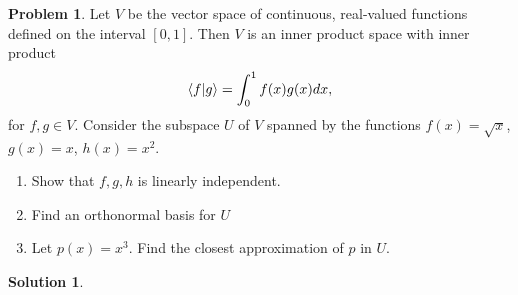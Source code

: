 \documentclass[10pt]{article}
\theoremstyle{definition}
\newtheorem{problem}{Problem}
\newtheorem{soln}{Solution}
\begin{document}
\begin{problem}
  Let $V$ be the vector space of continuous, real-valued functions defined
  on the interval $[0, 1]$. Then $V$ is an inner product space with inner
  product
  $$\braket{f}{g}=\int_{0}^{1}f(x)g(x)dx,$$
  for $f,g\in V$. Consider the subspace $U$ of $V$ spanned by the functions $f(x)=\sqrt{x}$, $g(x)=x$, $h(x)=x^2$.
  \begin{enumerate}[label=(\alph*)]
    \item Show that $f, g, h$ is linearly independent.
    \item Find an orthonormal basis for $U$
    \item Let $p(x)=x^3$. Find the closest approximation of $p$ in $U$.
  \end{enumerate}
\end{problem}
\begin{soln}
\end{soln}
\end{document}

